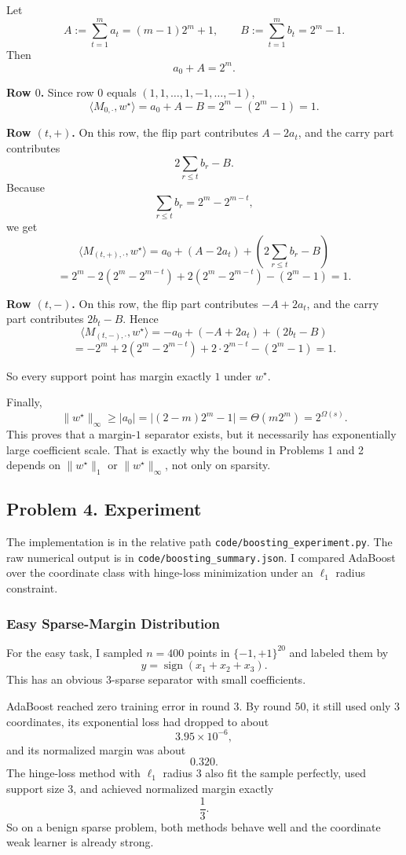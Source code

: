 \documentclass{article}
\DeclareMathOperator{\sign}{sign}
\begin{document}
Let
$$
A := \sum_{t=1}^m a_t = (m-1)2^m+1,
\qquad
B := \sum_{t=1}^m b_t = 2^m-1.
$$
Then
$$
a_0 + A = 2^m.
$$

\textbf{Row $0$.}
Since row $0$ equals $(1,1,\dots,1,-1,\dots,-1)$,
$$
\langle M_{0,\cdot},w^\star\rangle
=
a_0 + A - B
=
2^m-(2^m-1)
=
1.
$$

\textbf{Row $(t,+)$.}
On this row, the flip part contributes $A-2a_t$, and the carry part contributes
$$
2\sum_{r\le t} b_r - B.
$$
Because
$$
\sum_{r\le t} b_r = 2^m - 2^{m-t},
$$
we get
$$
\langle M_{(t,+),\cdot},w^\star\rangle
=
a_0 + (A-2a_t) + \left(2\sum_{r\le t} b_r - B\right)
$$
$$
=
2^m - 2(2^m-2^{m-t}) + 2(2^m-2^{m-t}) - (2^m-1)
=
1.
$$

\textbf{Row $(t,-)$.}
On this row, the flip part contributes $-A+2a_t$, and the carry part contributes $2b_t-B$. Hence
$$
\langle M_{(t,-),\cdot},w^\star\rangle
=
-a_0 + (-A+2a_t) + (2b_t-B)
$$
$$
=
-2^m + 2(2^m-2^{m-t}) + 2\cdot 2^{m-t} - (2^m-1)
=
1.
$$

So every support point has margin exactly $1$ under $w^\star$.

Finally,
$$
\|w^\star\|_\infty
\ge
|a_0|
=
\bigl|(2-m)2^m-1\bigr|
=
\Theta(m2^m)
=
2^{\Omega(s)}.
$$
This proves that a margin-$1$ separator exists, but it necessarily has exponentially large coefficient scale. That is exactly why the bound in Problems 1 and 2 depends on $\|w^\star\|_1$ or $\|w^\star\|_\infty$, not only on sparsity.

\subsection{Problem 4. Experiment}

The implementation is in the relative path \verb|code/boosting_experiment.py|. The raw numerical output is in \verb|code/boosting_summary.json|. I compared AdaBoost over the coordinate class with hinge-loss minimization under an $\ell_1$ radius constraint.

\subsubsection{Easy Sparse-Margin Distribution}

For the easy task, I sampled $n=400$ points in $\{-1,+1\}^{20}$ and labeled them by
$$
y=\sign(x_1+x_2+x_3).
$$
This has an obvious $3$-sparse separator with small coefficients.

AdaBoost reached zero training error in round $3$. By round $50$, it still used only $3$ coordinates, its exponential loss had dropped to about
$$
3.95\times 10^{-6},
$$
and its normalized margin was about
$$
0.320.
$$
The hinge-loss method with $\ell_1$ radius $3$ also fit the sample perfectly, used support size $3$, and achieved normalized margin exactly
$$
\frac13.
$$
So on a benign sparse problem, both methods behave well and the coordinate weak learner is already strong.
\end{document}
